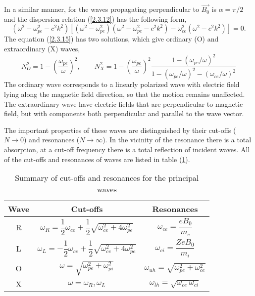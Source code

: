 In a similar manner, for the waves propagating perpendicular to $ \vec{B_{0}} $ is $ \alpha = \pi/2 $ and the dispersion relation (\ref{2.3.12}) has the following form,
\begin{equation}
\label{2.3.15}
\left( \omega^{2} - \omega_{pe}^{2} - c^{2} k^{2} \right) \left[ \left( \omega^{2} - \omega_{pe}^{2} \right) \left( \omega^{2} - \omega_{pe}^{2} - c^{2} k^{2} \right) - \omega_{ce}^{2} \left( \omega^{2} - c^{2} k^{2} \right) \right] = 0.
\end{equation}
The equation (\ref{2.3.15}) has two solutions, which give ordinary (O) and extraordinary (X) waves,
\begin{equation}
N_{O}^{2} = 1 - \left( \frac{\omega_{pe}}{\omega} \right)^{2}, \qquad N_{X}^{2} = 1 - \left( \frac{\omega_{pe}}{\omega} \right)^{2} \frac{1 - \left( \omega_{pe} / \omega\right)^{2}}{1 - \left( \omega_{pe} / \omega\right)^{2} - \left( \omega_{ce} / \omega\right)^{2}}
\end{equation}
The ordinary wave corresponds to a linearly polarized wave with electric field lying along the magnetic field direction, so that the motion remains unaffected. The extraordinary wave have electric fields that are perpendicular to magnetic field, but with components both perpendicular and parallel to the wave vector.

The important properties of these waves are distinguished by their cut-offs ($ N \rightarrow 0 $) and resonances ($ N \rightarrow \infty $). In the vicinity of the resonance there is a total absorption, at a cut-off frequency there is a total reflection of incident waves. All of the cut-offs and resonances of waves are listed in table (\ref{2.3.16}).
\begingroup
\renewcommand*{\arraystretch}{2.5}
\begin{table}[h!]
\centering
\begin{tabular}{ c | c | c }
Wave & Cut-offs & Resonances \\ \hline \hline
R & $ \omega_{R} = \dfrac{1}{2} \omega_{ce} + \dfrac{1}{2} \sqrt{\omega_{ce}^{2} + 4 \omega_{pe}^{2} } $ & $ \omega_{ce} = \dfrac{e B_{0}}{m_{e}} $ \\ \hline
L & $ \omega_{L} = - \dfrac{1}{2} \omega_{ce} + \dfrac{1}{2} \sqrt{\omega_{ce}^{2} + 4 \omega_{pe}^{2}} $ & $ \omega_{ci} = \dfrac{Z e B_{0}}{m_{i}} $ \\ \hline
O & $ \omega = \sqrt{\omega_{pe}^{2} + \omega_{pi}^{2}} $ & $ \omega_{uh} = \sqrt{\omega_{pe}^{2} + \omega_{ce}^{2}} $ \\ \hline
X & $ \omega = \omega_{R}, \omega_{L} $ & $ \omega_{lh} = \sqrt{\omega_{ce} \: \omega_{ci}} $ \\
\end{tabular}
\caption{Summary of cut-offs and resonances for the principal waves}
\label{2.3.16}
\end{table}
\endgroup
